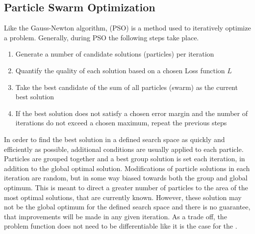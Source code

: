 
\subsection{Particle Swarm Optimization}
\label{sec:PSO}
Like the Gauss-Newton algorithm,  (PSO) is a method used to iteratively optimize a problem.
Generally, during PSO the following steps take place.

\begin{enumerate}
	\item Generate a number of candidate solutions (particles) per iteration
	\item Quantify the quality of each solution based on a chosen Loss function $L$
	\item Take the best candidate of the sum of all particles (swarm) as the current best solution
	\item If the best solution does not satisfy a chosen error margin and the number of iterations do not exceed a chosen
		maximum, repeat the previous steps
\end{enumerate}


In order to find the best solution in a defined search space as quickly and efficiently as possible, additional conditions are usually applied
to each particle. Particles are grouped together and a best group solution is set each iteration, in addition to the global optimal solution.
Modifications of particle solutions in each iteration are random, but in some way biased towards both the group and global optimum.
This is meant to direct a greater number of particles to the area of the most optimal solutions, that are currently known.
However, these solution may not be the global optimum for the defined search space and there is no guarantee, that improvements will be made in any
given iteration. As a trade off, the problem function does not need to be differentiable like it is the case for the . \newline

